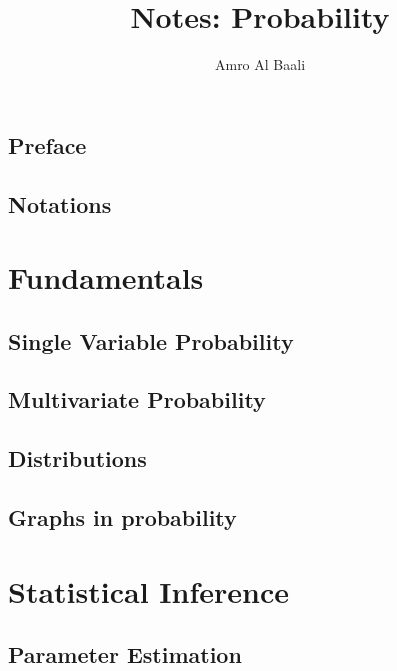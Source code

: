 \documentclass{Templates/amro-notes}
\title{Notes: Probability}
\author{{Amro Al Baali}}
\date{\daterange}
\begin{document}
\maketitle
\tableofcontents
{} 


\chapter*{Preface}


\clearpage
\chapter*{Notations}


\clearpage
{} 
\part{Fundamentals}
\label{part:fundamentals}

\chapter{Single Variable Probability}


\clearpage
\chapter{Multivariate Probability}


\clearpage
\chapter{Distributions}


\clearpage
\chapter{Graphs in probability}


\clearpage
\part{Statistical Inference}

% 

\chapter{Parameter Estimation}



\begin{appendices}
    
\end{appendices}


\end{document}
